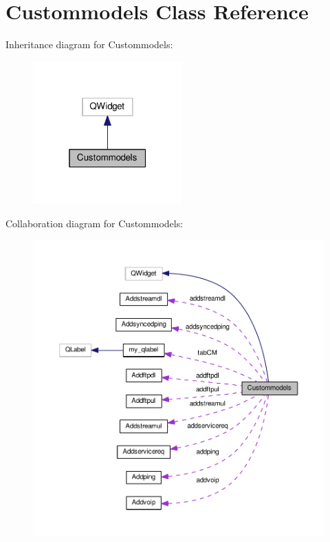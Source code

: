 \hypertarget{class_custommodels}{}\section{Custommodels Class Reference}
\label{class_custommodels}


Inheritance diagram for Custommodels\+:
\nopagebreak
\begin{figure}[H]
\begin{center}
\leavevmode
\includegraphics[width=163pt]{class_custommodels__inherit__graph}
\end{center}
\end{figure}


Collaboration diagram for Custommodels\+:
\nopagebreak
\begin{figure}[H]
\begin{center}
\leavevmode
\includegraphics[width=350pt]{class_custommodels__coll__graph}
\end{center}
\end{figure}
